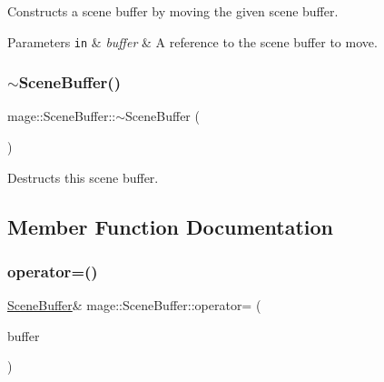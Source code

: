 Constructs a scene buffer by moving the given scene buffer.


\begin{DoxyParams}[1]{Parameters}
\mbox{\tt in}  & {\em buffer} & A reference to the scene buffer to move. \\
\hline
\end{DoxyParams}
\hypertarget{structmage_1_1_scene_buffer_a47cb01e808fd210d7cb4ffe7d3cdf4ce}{}\label{structmage_1_1_scene_buffer_a47cb01e808fd210d7cb4ffe7d3cdf4ce} 
\subsubsection{\texorpdfstring{$\sim$\+Scene\+Buffer()}{~SceneBuffer()}}
{\footnotesize\ttfamily mage\+::\+Scene\+Buffer\+::$\sim$\+Scene\+Buffer (\begin{DoxyParamCaption}{ }\end{DoxyParamCaption})\hspace{0.3cm}{\ttfamily [default]}}

Destructs this scene buffer. 

\subsection{Member Function Documentation}
\hypertarget{structmage_1_1_scene_buffer_a3b576a5f5511547ba7bf241d22a63a96}{}\label{structmage_1_1_scene_buffer_a3b576a5f5511547ba7bf241d22a63a96} 
\subsubsection{\texorpdfstring{operator=()}{operator=()}\hspace{0.1cm}{\footnotesize\ttfamily [1/2]}}
{\footnotesize\ttfamily \hyperlink{structmage_1_1_scene_buffer}{Scene\+Buffer}\& mage\+::\+Scene\+Buffer\+::operator= (\begin{DoxyParamCaption}\item[{const \hyperlink{structmage_1_1_scene_buffer}{Scene\+Buffer} \&}]{buffer }\end{DoxyParamCaption})\hspace{0.3cm}{\ttfamily [default]}}

